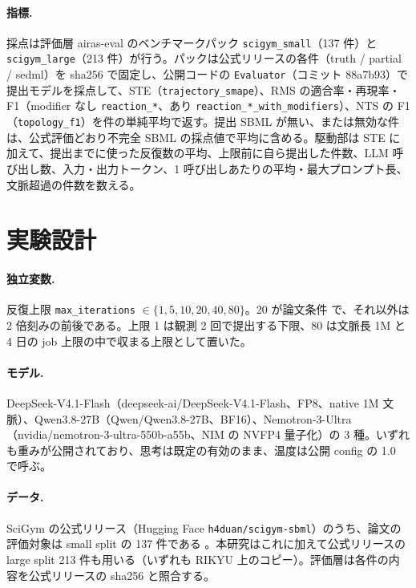 \documentclass{article}
\begin{document}
\paragraph{指標.}
採点は評価層 airas-eval のベンチマークパック \texttt{scigym\_small}（137 件）と \texttt{scigym\_large}（213 件）が行う。パックは公式リリースの各件（truth / partial / sedml）を sha256 で固定し、公開コードの \texttt{Evaluator}（コミット 88a7b93）で提出モデルを採点して、STE（\texttt{trajectory\_smape}）、RMS の適合率・再現率・F1（modifier なし \texttt{reaction\_*}、あり \texttt{reaction\_*\_with\_modifiers}）、NTS の F1（\texttt{topology\_f1}）を件の単純平均で返す。提出 SBML が無い、または無効な件は、公式評価どおり不完全 SBML の採点値で平均に含める。駆動部は STE に加えて、提出までに使った反復数の平均、上限前に自ら提出した件数、LLM 呼び出し数、入力・出力トークン、1 呼び出しあたりの平均・最大プロンプト長、文脈超過の件数を数える。

\section{実験設計}
\label{sec:design}
\paragraph{独立変数.}
反復上限 \texttt{max\_iterations} $\in \{1, 5, 10, 20, 40, 80\}$。20 が論文条件 \cite[s1.p3]{duan-2025-measuring} で、それ以外は 2 倍刻みの前後である。上限 1 は観測 2 回で提出する下限、80 は文脈長 1M と 4 日の job 上限の中で収まる上限として置いた。

\paragraph{モデル.}
DeepSeek-V4.1-Flash（deepseek-ai/DeepSeek-V4.1-Flash、FP8、native 1M 文脈）、Qwen3.8-27B（Qwen/Qwen3.8-27B、BF16）、Nemotron-3-Ultra（nvidia/nemotron-3-ultra-550b-a55b、NIM の NVFP4 量子化）の 3 種。いずれも重みが公開されており、思考は既定の有効のまま、温度は公開 config の 1.0 \cite[s2.p1]{h4duan-2025-scigym} で呼ぶ。

\paragraph{データ.}
SciGym の公式リリース（Hugging Face \texttt{h4duan/scigym-sbml}）のうち、論文の評価対象は small split の 137 件である \cite[s1.p2]{duan-2025-measuring}。本研究はこれに加えて公式リリースの large split 213 件も用いる（いずれも RIKYU 上のコピー）。評価層は各件の内容を公式リリースの sha256 と照合する。
\end{document}
